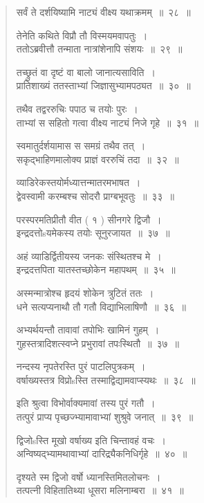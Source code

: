 \documentclass[11pt, openany]{book}
\makeatletter
\newcommand{\devanagarinumeral}[1]{
\devanagaridigits{\number \csname c@#1\endcsname}} %
\makeatother
\begin{document}
\fancyhead[CE,CO]{\thepage}
\cfoot{}
\newpage
\renewcommand{\thepage}{\devanagarinumeral{page}}
\setcounter{page}{2}

\begin{multicols}{2}
\begin{quote}
{\mbh सर्वं ते दर्शयिष्यामि नाट्यं वीक्ष्य यथाक्रमम्~॥~२८~॥

तेनेति कथिते विप्रौ तौ विस्मयमवापतुः~।\\
ततोऽब्रवीत्तौ तन्माता नात्रांशेनापि संशयः~॥~२९~॥

तच्छ्रुतं वा दृष्टं वा बालो जानात्यसाविति~।\\
प्रातिशाख्यं ततस्ताभ्यां जिज्ञासुभ्यामपठ्यत~॥~३०~॥

तथैव तद्वररुचिः पपाठ च तयोः पुरः~।\\
ताभ्यां स सहितो गत्वा वीक्ष्य नाट्यं निजे गृहे~॥~३१~॥

स्वमातुर्दर्शयामास स समग्रं तथैव तत्~।\\
सकृद्भाहिणमालोक्य प्राज्ञं वररुचिं तदा~॥~३२~॥

व्याडिरेकस्तयोर्मध्यात्तन्मातरमभाषत~।\\
द्वेवस्वामी करम्बश्च सोदरौ प्राग्बभूवतुः~॥~३३~॥

परस्परमतिप्रीतौ वीत ( १ ) सीनगरे द्विजौ~।\\
इन्द्रदत्तोsयमेकस्य तयोः सूनुरजायत~॥~३७~॥

अहं व्याडिर्द्वितीयस्य जनकः संस्थितश्च मे~।\\
इन्द्रदत्तपिता यातस्तच्छोकेन महापथम्~॥~३५~॥

अस्मन्मात्रोश्च हृदयं शोकेन त्रुटितं ततः~।\\
धने सत्यप्यनाथौ तौ गतौ विद्याभिलाषिणौ~॥~३६~॥

अभ्यर्थयन्तौ तावावां तपोभिः खामिनं गुहम्~।\\
गुहस्तत्रादिशत्स्वप्ने प्रभुरावां तपःस्थितौ~॥~३७~॥

नन्दस्य नृपतेरस्ति पुरं पाटलिपुत्रकम्~।\\
वर्षाख्यस्तत्र विप्रोsस्ति तस्माद्विद्यामवाप्स्यथः~॥~३८~॥

इति श्रुत्वा विभोर्वाक्यमावां तस्य पुरं गतौ~।\\
तत्पुरं प्राप्य पृच्छज्भ्यामावाभ्यां शुश्रुवे जनात्~॥~३९~॥

द्विजोsस्ति मूखो वर्षाख्य इति चिन्तावहं वचः~।\\
अन्विष्यद्भ्यामथावाभ्यां दारिद्र्यैकनिधिर्गृहे~॥~४०~॥

दृश्यते स्म द्विजो वर्षो ध्यानस्तिमितलोचनः~।\\
तत्पत्नी विहितातिथ्या धूसरा मलिनाम्बरा~॥~४१~॥

}
\end{quote}
\end{multicols}
\end{document}

